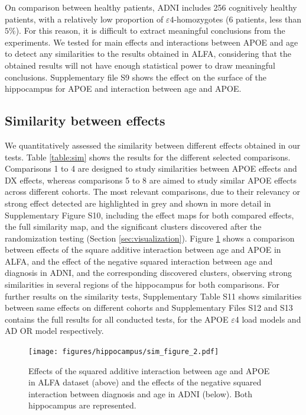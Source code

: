 On comparison between healthy patients, ADNI includes 256 cognitively healthy patients, with a relatively low proportion of $\varepsilon4$-homozygotes (6 patients, less than $5\%$). For this reason, it is difficult to extract meaningful conclusions from the experiments. We tested for main effects and interactions between APOE and age to detect any similarities to the results obtained in ALFA, considering that the obtained results will not have enough statistical power to draw meaningful conclusions. Supplementary file S9 shows the effect on the surface of the hippocampus for APOE and interaction between age and APOE. \\

\subsection{Similarity between effects}
\label{sec:similarity}

We quantitatively assessed the similarity between different effects obtained in our tests. Table \ref{table:sim} shows the results for the different selected comparisons. Comparisons 1 to 4 are designed to study similarities between APOE effects and DX effects, whereas comparisons 5 to 8 are aimed to study similar APOE effects across different cohorts. The most relevant comparisons, due to their relevancy or strong effect detected are highlighted in grey and shown in more detail in Supplementary Figure S10, including the effect maps for both compared effects, the full similarity map, and the significant clusters discovered after the randomization testing (Section \ref{sec:visualization}). Figure \ref{fig:sim_2} shows a comparison between effects of the square additive interaction between age and APOE in ALFA, and the effect of the negative squared interaction between age and diagnosis in ADNI, and the corresponding discovered clusters, observing strong similarities in several regions of the hippocampus for both comparisons. For further results on the similarity tests, Supplementary Table S11 shows similarities between same effects on different cohorts and Supplementary Files S12 and S13 contains the full results for all conducted tests, for the APOE $\varepsilon$4 load models and AD OR model respectively. \\

\begin{figure}[htbp]
  \centering
  \texttt{[image: figures/hippocampus/sim\_figure\_2.pdf]}
  \caption[Effects of the squared additive interaction between age and APOE in ALFA.]{Effects of the squared additive interaction between age and APOE in ALFA dataset (above) and the effects of the negative squared interaction between diagnosis and age in ADNI (below). Both hippocampus are represented.}\label{fig:sim_2}
\end{figure}


